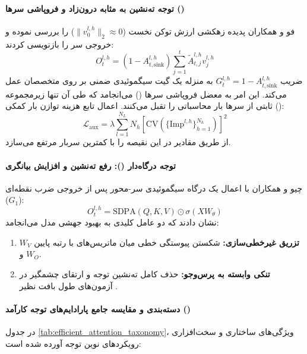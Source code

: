 \paragraph*{توجه ته‌نشین به مثابه  درون‌زاد و فروپاشی سرها ()}
فو و همکاران \cite{fu2026attention} پدیده زهکشی ارزش توکن نخست ($\|v_0^{l,h}\|_2 \approx 0$) را بررسی نموده و خروجی سر را بازنویسی کردند:
\begin{equation}
    O_t^{l,h} = (1 - A_{t,\text{sink}}^{l,h}) \sum_{j=1}^{t} \tilde{A}_{t,j}^{l,h} v_j^{l,h}
\end{equation}
ضریب $G_t^{l,h} = 1 - A_{t,\text{sink}}^{l,h}$ به منزله یک گیت سیگموئیدی ضمنی بر روی متخصصان عمل می‌کند. این امر به معضل فروپاشی سرها () می‌انجامد که طی آن تنها زیرمجموعه ثابتی از سرها بار محاسباتی را تقبل می‌کنند. اعمال تابع هزینه توازن بار کمکی ():
\begin{equation}
    \mathcal{L}_{\text{aux}} = \lambda \sum_{l=1}^{N_L} N_h \left[ \text{CV}\left(\{\text{Imp}^{l,h}\}_{h=1}^{N_h}\right) \right]^2
\end{equation}
از طریق مقادیر  در  این نقیصه را با کمترین سربار مرتفع می‌سازد.

\paragraph*{توجه درگاه‌دار (): رفع ته‌نشین و افزایش بیانگری}
چیو و همکاران \cite{qiu2025gated} با اعمال یک درگاه سیگموئیدی سر-محور پس از خروجی ضرب نقطه‌ای ($G_1$):
\begin{equation}
    O_t^{l,h} = \text{SDPA}(Q, K, V) \odot \sigma(X W_\theta)
\end{equation}
نشان دادند که دو عامل کلیدی به بهبود جهشی مدل می‌انجامد:
\begin{enumerate}
    \item \textbf{تزریق غیرخطی‌سازی:} شکستن پیوستگی خطی میان ماتریس‌های با رتبه پایین $W_V$ و $W_O$.
    \item \textbf{تنکی وابسته به پرس‌وجو:} حذف کامل ته‌نشین توجه و ارتقای چشمگیر در آزمون‌های طول بافت نظیر .
\end{enumerate}

\paragraph*{دسته‌بندی و مقایسه جامع پارادایم‌های توجه کارآمد ()}
در جدول \ref{tab:efficient_attention_taxonomy}، ویژگی‌های ساختاری و سخت‌افزاری رویکردهای نوین توجه آورده شده است:

